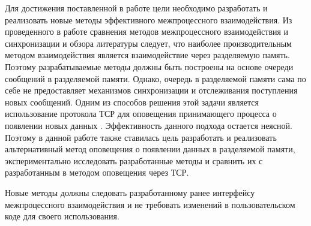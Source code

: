 Для достижения поставленной в работе цели необходимо разработать и реализовать новые методы эффективного межпроцессного взаимодействия. Из проведенного в работе сравнения методов межпроцессного взаимодействия и синхронизации и обзора литературы следует, что наиболее производительным методом взаимодействия является взаимодействие через разделяемую память. Поэтому разрабатываемые методы должны быть построены на основе очереди сообщений в разделяемой памяти. Однако, очередь в разделяемой памяти сама по себе не предоставляет механизмов синхронизации и отслеживания поступления новых сообщений. Одним из способов решения этой задачи является использование протокола ТСР для оповещения принимающего процесса о появлении новых данных \cite{GubarevKMU18}. Эффективность данного подхода остается неясной. Поэтому в данной работе также ставилась цель разработать и реализовать альтернативный метод оповещения о появлении данных в разделяемой памяти, экспериментально исследовать разработанные методы и сравнить их с разработанным в \cite{GubarevKMU18} методом оповещения через ТСР.

Новые методы должны следовать разработанному ранее интерфейсу межпроцессного взаимодействия и не требовать изменений в пользовательском коде для своего использования.



